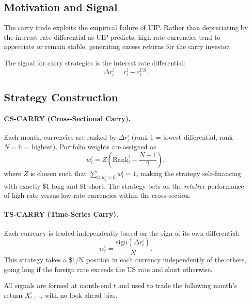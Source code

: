 \documentclass[a4paper,12pt]{article}
\begin{document}
\subsection{Motivation and Signal}

The carry trade exploits the empirical failure of UIP. Rather than depreciating by the
interest rate differential as UIP predicts, high-rate currencies tend to appreciate or
remain stable, generating excess returns for the carry investor.

The signal for carry strategies is the interest rate differential:
\begin{equation}
    \Delta r^i_t = r^i_t - r^{US}_t.
\end{equation}

\subsection{Strategy Construction}

\paragraph{CS-CARRY (Cross-Sectional Carry).}
Each month, currencies are ranked by $\Delta r^i_t$ (rank 1 = lowest differential, rank
$N = 6$ = highest). Portfolio weights are assigned as
\begin{equation}
    w^i_t = Z \left( \mathrm{Rank}^i_t - \frac{N+1}{2} \right),
\end{equation}
where $Z$ is chosen such that $\sum_{i:\, w^i_t > 0} w^i_t = 1$, making the strategy
self-financing with exactly \$1 long and \$1 short. The strategy bets on the
\emph{relative} performance of high-rate versus low-rate currencies within the
cross-section.

\paragraph{TS-CARRY (Time-Series Carry).}
Each currency is traded independently based on the sign of its own differential:
\begin{equation}
    w^i_t = \frac{\mathrm{sign}(\Delta r^i_t)}{N}.
\end{equation}
This strategy takes a \$1/N position in each currency independently of the others, going
long if the foreign rate exceeds the US rate and short otherwise.

All signals are formed at month-end $t$ and used to trade the following month's return
$X^i_{t+1}$, with no look-ahead bias.
\end{document}
